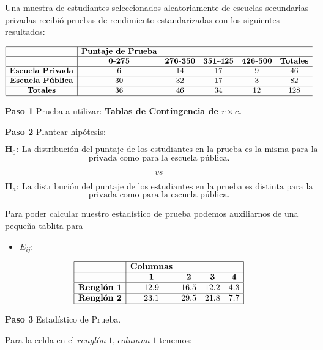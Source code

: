 \documentclass[
  a4paper,
  oneside,
  openany]{book}
\providecommand{\tightlist}{%
  \setlength{\itemsep}{0pt}\setlength{\parskip}{0pt}}
\begin{document}
Una muestra de estudiantes seleccionados aleatoriamente de escuelas secundarias privadas recibió pruebas de rendimiento estandarizadas con los siguientes resultados:

\[
\begin{array}{ |c|cc c c c c|}
\hline
&\textbf{Puntaje de Prueba}&&&&\\
\hline
&\textbf{0-275} & \textbf{276-350} & \textbf{351-425} & \textbf{426-500} & \textbf{Totales} \\
\hline
\textbf{Escuela Privada} & 6    & 14 & 17 & 9 & 46 \\
\hline
\textbf{Escuela Pública} & 30   & 32 & 17 & 3 & 82 \\
\hline
\textbf{Totales} & 36   & 46 & 34 & 12 & 128 \\
\hline
\end{array}
\]

\textbf{Paso 1} Prueba a utilizar: \textbf{Tablas de Contingencia de \(r\times c\).}

\textbf{Paso 2} Plantear hipótesis:

\[\textbf{H}_0: \ \mbox{La distribución del puntaje de los estudiantes en la prueba es la misma para la escuela}\]
\[\mbox{privada como para la escuela pública.}\]

\[vs\]

\[\textbf{H}_a: \ \mbox{La distribución del puntaje de los estudiantes en la prueba es distinta para la escuela}\]
\[\mbox{privada como para la escuela pública.}\]

Para poder calcular nuestro estadístico de prueba podemos auxiliarnos de una pequeña tablita para

\begin{itemize}
\tightlist
\item
  \(E_{ij}:\)
\end{itemize}

\[
\begin{array}{ |c|cccc|  }
\hline
&\textbf{Columnas} & & &\\
\hline
&\textbf{1} & \textbf{2} & \textbf{3} & \textbf{4} \\
\hline
\textbf{Renglón 1} & 12.9   & 16.5 & 12.2 & 4.3 \\
\hline
\textbf{Renglón 2} & 23.1   & 29.5 & 21.8 & 7.7 \\
\hline
\end{array}
\]

\textbf{Paso 3} Estadístico de Prueba.

Para la celda en el \(renglón\ 1\), \(columna\ 1\) tenemos:
\end{document}
